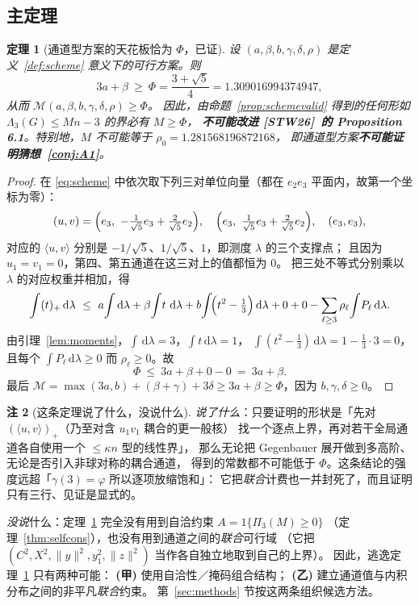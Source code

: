 \documentclass[UTF8,11pt]{ctexart}
\newtheorem{theorem}{定理}[section]
\theoremstyle{definition}
\newtheorem{remark}[theorem]{注}
\newcommand{\Lam}{\Lambda}
\newcommand{\dd}{\,\mathrm{d}}
\newcommand{\STW}{\textup{[STW26]}}
\begin{document}
\subsection{主定理}

\begin{theorem}[通道型方案的天花板恰为 $\Phi$，已证]\label{thm:zonal}
设 $(a,\beta,b,\gamma,\delta,\rho)$ 是定义~\ref{def:scheme} 意义下的可行方案。则
\[
3a+\beta\ \ge\ \Phi=\frac{3+\sqrt5}{4}=1.309016994374947,
\]
从而 $\mathcal M(a,\beta,b,\gamma,\delta,\rho)\ge\Phi$。
因此，由命题~\ref{prop:schemevalid} 得到的任何形如 $\Lam_3(G)\le Mn-3$ 的界必有 $M\ge\Phi$，
\textbf{不可能改进 \STW\ 的 Proposition 6.1}。特别地，$M$ 不可能等于 $\rho_0=1.281568196872168$，
即通道型方案\textbf{不可能证明猜想~\ref{conj:A1}}。
\end{theorem}

\begin{proof}
在 \eqref{eq:scheme} 中依次取下列三对单位向量（都在 $e_2e_3$ 平面内，故第一个坐标为零）：
\[
(u,v)=\Bigl(e_3,\ -\tfrac1{\sqrt5}e_3+\tfrac2{\sqrt5}e_2\Bigr),\quad
\Bigl(e_3,\ \tfrac1{\sqrt5}e_3+\tfrac2{\sqrt5}e_2\Bigr),\quad (e_3,e_3),
\]
对应的 $\langle u,v\rangle$ 分别是 $-1/\sqrt5$、$1/\sqrt5$、$1$，即测度 $\lambda$ 的三个支撑点；
且因为 $u_1=v_1=0$，第四、第五通道在这三对上的值都恒为 $0$。
把三处不等式分别乘以 $\lambda$ 的对应权重并相加，得
\[
\int(t)_+\dd\lambda\ \le\ a\!\int\!\dd\lambda+\beta\!\int\! t\,\dd\lambda
+b\!\int\!\Bigl(t^2-\tfrac13\Bigr)\dd\lambda+0+0-\sum_{\ell\ge3}\rho_\ell\!\int\! P_\ell\dd\lambda .
\]
由引理~\ref{lem:moments}，$\int\dd\lambda=3$，$\int t\dd\lambda=1$，
$\int(t^2-\frac13)\dd\lambda=1-\frac13\cdot3=0$，且每个 $\int P_\ell\dd\lambda\ge0$ 而 $\rho_\ell\ge0$。故
\[
\Phi\ \le\ 3a+\beta+0-0\ =\ 3a+\beta .
\]
最后 $\mathcal M=\max(3a,b)+(\beta+\gamma)+3\delta\ge 3a+\beta\ge\Phi$，因为 $b,\gamma,\delta\ge0$。
\end{proof}

\begin{remark}[这条定理说了什么，没说什么]\label{rmk:scope}
\emph{说了什么}：只要证明的形状是「先对 $(\langle u,v\rangle)_+$（乃至对含 $u_1v_1$ 耦合的更一般核）
找一个逐点上界，再对若干全局通道各自使用一个 $\le\kappa n$ 型的线性界」，
那么无论把 Gegenbauer 展开做到多高阶、无论是否引入非球对称的耦合通道，
得到的常数都不可能低于 $\Phi$。这条结论的强度远超「$\gamma(3)=\varphi$ 所以逐项放缩饱和」：
它把\emph{联合}计费也一并封死了，而且证明只有三行、见证是显式的。

\emph{没说}什么：定理~\ref{thm:zonal} 完全没有用到自洽约束 $A=1\{\Pi_3(M)\ge0\}$
（定理~\ref{thm:selfcons}），也没有用到通道之间的\emph{联合}可行域
（它把 $(C^2,X^2,\|y\|^2,y_1^2,\|z\|^2)$ 当作各自独立地取到自己的上界）。
因此，逃逸定理~\ref{thm:zonal} 只有两种可能：
\textbf{(甲)} 使用自洽性／掩码组合结构；
\textbf{(乙)} 建立通道值与内积分布之间的非平凡\emph{联合}约束。
第~\ref{sec:methods} 节按这两条组织候选方法。
\end{remark}
\end{document}

